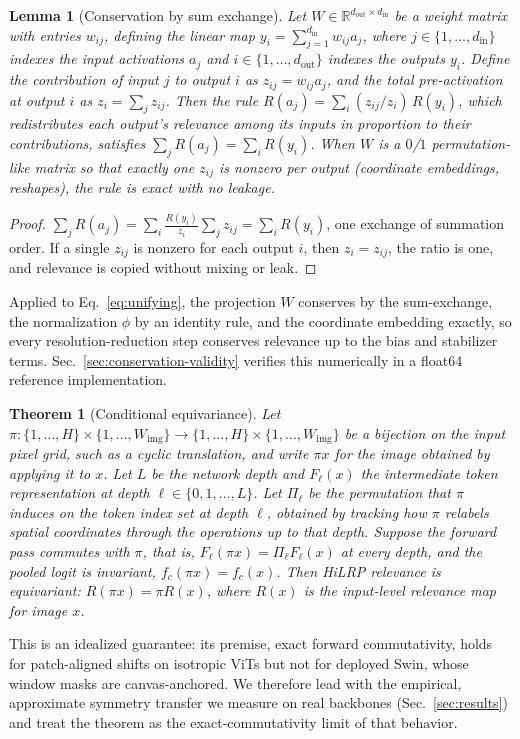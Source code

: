 \documentclass[lettersize,journal]{IEEEtran}
\newtheorem{theorem}{Theorem}
\newtheorem{lemma}{Lemma}
\theoremstyle{definition}
\theoremstyle{plain}
\begin{document}
\begin{lemma}[Conservation by sum exchange]
\label{lem:conservation}
Let $W\in\mathbb{R}^{d_{\mathrm{out}}\times d_{\mathrm{in}}}$ be a weight matrix
with entries $w_{ij}$, defining the linear map
$y_i=\sum_{j=1}^{d_{\mathrm{in}}} w_{ij}a_j$, where $j\in\{1,\dots,d_{\mathrm{in}}\}$
indexes the input activations $a_j$ and $i\in\{1,\dots,d_{\mathrm{out}}\}$ indexes
the outputs $y_i$. Define the \emph{contribution} of input $j$ to output $i$ as
$z_{ij}=w_{ij}a_j$, and the total pre-activation at output $i$ as
$z_i=\sum_{j} z_{ij}$. Then the rule
$R(a_j)=\sum_i (z_{ij}/z_i)\,R(y_i)$, which redistributes each output's relevance
among its inputs in proportion to their contributions, satisfies
$\sum_j R(a_j)=\sum_i R(y_i)$. When $W$ is a $0$/$1$ permutation-like matrix so
that exactly one $z_{ij}$ is nonzero per output (coordinate embeddings,
reshapes), the rule is exact with no leakage.
\end{lemma}
\begin{proof}
$\sum_j R(a_j)=\sum_i \tfrac{R(y_i)}{z_i}\sum_j z_{ij}=\sum_i R(y_i)$, one exchange of summation order. If a single $z_{ij}$ is nonzero for each output $i$, then $z_i=z_{ij}$, the ratio is one, and relevance is copied without mixing or leak.
\end{proof} 

Applied to Eq.~\eqref{eq:unifying}, the projection $W$ conserves by the sum-exchange, the normalization $\phi$ by an identity rule, and the coordinate embedding exactly, so every resolution-reduction step conserves relevance up to the bias and stabilizer terms. Sec.~\ref{sec:conservation-validity} verifies this numerically in a float64 reference implementation.

\begin{theorem}[Conditional equivariance]
\label{thm:equivariance}
Let $\pi:\{1,\dots,H\}\times\{1,\dots,W_{\mathrm{img}}\}\to\{1,\dots,H\}\times\{1,\dots,W_{\mathrm{img}}\}$
be a bijection on the input pixel grid, such as a cyclic translation, and write $\pi x$ for the image obtained by applying it to $x$. Let $L$ be the network depth and $F_\ell(x)$ the intermediate token representation at depth $\ell\in\{0,1,\dots,L\}$. Let $\Pi_\ell$ be the permutation that $\pi$ induces on the token index set at depth $\ell$, obtained by tracking how $\pi$ relabels spatial coordinates through the operations up to that depth. Suppose the forward pass commutes with $\pi$, that is, $F_\ell(\pi x)=\Pi_\ell F_\ell(x)$ at every depth, and the pooled logit is invariant, $f_c(\pi x)=f_c(x)$. Then HiLRP relevance is equivariant: $R(\pi x)=\pi R(x)$, where $R(x)$ is the input-level relevance map for image $x$.
\end{theorem}
\noindent This is an idealized guarantee: its premise, exact forward commutativity, holds for patch-aligned shifts on isotropic ViTs but not for deployed Swin, whose window masks are canvas-anchored. We therefore lead with the empirical, approximate symmetry transfer we measure on real backbones (Sec.~\ref{sec:results}) and treat the theorem as the exact-commutativity limit of that behavior.
\end{document}
